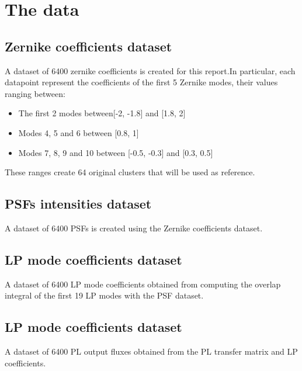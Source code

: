 \section{The data}

	\subsection{Zernike coefficients dataset}
			A dataset of 6400 zernike coefficients is created for this report.In particular, each datapoint represent the coefficients of the first 5 Zernike modes, their values ranging between:
			\begin{itemize}
				\item The first 2 modes between[-2, -1.8] and [1.8, 2]
				\item Modes 4, 5 and 6 between [0.8, 1]
				\item Modes 7, 8, 9 and 10 between [-0.5, -0.3] and [0.3, 0.5]
			\end{itemize}			 
			These ranges create 64 original clusters that will be used as reference.
			
	\subsection{PSFs intensities dataset}
		A dataset of 6400 PSFs is created using the Zernike coefficients dataset.
		
	\subsection{LP mode coefficients dataset}
		A dataset of 6400 LP mode coefficients obtained from computing the overlap integral of the first 19 LP modes with the PSF dataset.
		
	\subsection{LP mode coefficients dataset}
		A dataset of 6400 PL output fluxes obtained from the PL transfer matrix and LP coefficients.
		